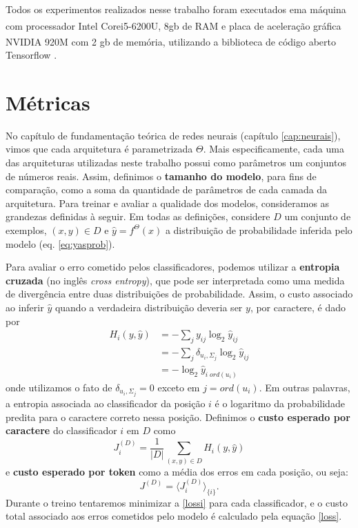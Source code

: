 Todos os experimentos realizados nesse trabalho foram executados ema máquina com processador Intel\textsuperscript{\textregistered} Core\texttrademark i5-6200U, 8gb de RAM e placa de aceleração gráfica NVIDIA\textsuperscript{\textregistered} 920M com 2 gb de memória, utilizando a biblioteca de código aberto Tensorflow \cite{abadi2016tensorflow}.

\section{Métricas}

No capítulo de fundamentação teórica de redes neurais (capítulo \ref{cap:neurais}), vimos que cada arquitetura é parametrizada $\Theta$. Mais especificamente, cada uma das arquiteturas utilizadas neste trabalho possui como parâmetros um conjuntos de números reais. Assim, definimos o \textbf{tamanho do modelo}, para fins de comparação, como a soma da quantidade de parâmetros de cada camada da arquitetura. Para treinar e avaliar a qualidade dos modelos, consideramos as grandezas definidas à seguir. Em todas as definições, considere $D$ um conjunto de exemplos, $(x,y) \in D$ e $\hat{y} = f^{\Theta}(x)$ a distribuição de probabilidade inferida pelo modelo (eq. \ref{eq:yasprob}). 

Para avaliar o erro cometido pelos classificadores, podemos utilizar a \textbf{entropia cruzada} (no inglês \textit{cross entropy}), que pode ser interpretada como uma medida de divergência entre duas distribuições de probabilidade. Assim, o custo associado ao inferir $\hat{y}$ quando a verdadeira distribuição deveria ser $y$, por caractere, é dado por
\begin{align}
	H_i(y, \hat{y}) &= -\sum_j y_{ij} \log_2{\hat{y}_{ij}} \\
					&= -\sum_j \delta_{u_i, \Sigma_{j}} \log_2{\hat{y}_{ij}} \\
					&= -\log_2{\hat{y}_{i\;ord(u_i)}}
\end{align}
onde utilizamos o fato de $\delta_{u_i, \Sigma_{j}} = 0$ exceto em $j = ord(u_i)$. Em outras palavras, a entropia associada ao classificador da posição $i$ é o logaritmo da probabilidade predita para o caractere correto nessa posição. Definimos o \textbf{custo esperado por caractere} do classificador $i$ em $D$ como 
\begin{equation} \label{lossi} 
	J_i^{(D)} = \frac{1}{|D|} \sum_{(x,y) \in D} H_i(y, \hat{y})
\end{equation}
e \textbf{custo esperado por token} como a média dos erros em cada posição, ou seja:
\begin{equation} \label{loss}
	J^{(D)} = \langle J_i^{(D)} \rangle_{\{i\}} .
\end{equation}
Durante o treino tentaremos minimizar a \ref{lossi} para cada classificador, e o custo total associado aos erros cometidos pelo modelo é calculado pela equação \ref{loss}.

